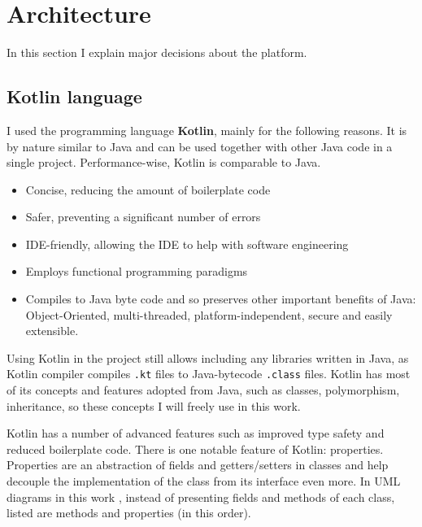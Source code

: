 \section{Architecture}

In this section I explain major decisions about the platform.


\subsection{Kotlin language}

I used the programming language \textbf{Kotlin}, mainly for the following reasons.
It is by nature similar to Java and can be used together with other Java code in a single project.
Performance-wise, Kotlin is comparable to Java.
\begin{itemize}
    \item Concise, reducing the amount of boilerplate code
    \item Safer, preventing a significant number of errors
    \item IDE-friendly, allowing the IDE to help with software engineering
    \item Employs functional programming paradigms\cite{Bonev}
    \item Compiles to Java byte code and so preserves other important benefits of Java: Object-Oriented, multi-threaded, platform-independent, secure and easily extensible.
\end{itemize}

Using Kotlin in the project still allows including any libraries written in Java, as Kotlin compiler compiles \texttt{.kt} files to Java-bytecode \texttt{.class} files.
Kotlin has most of its concepts and features adopted from Java, such as classes, polymorphism, inheritance, so these concepts I will freely use in this work.

Kotlin has a number of advanced features such as improved type safety and reduced boilerplate code\cite{JemerovKotlinAction2017}.
There is one notable feature of Kotlin: properties.
Properties are an abstraction of fields and getters/setters in classes and help decouple the implementation of the class from its interface even more.
In UML diagrams in this work , instead of presenting fields and methods of each class, listed are methods and properties (in this order).


